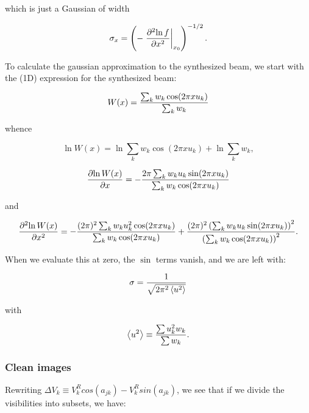 which is just a Gaussian of width

\begin{equation}
\sigma_x = \left(-\left.{\partial^2{\ln f}}\over{\partial{x^2}}\right|_{x_0}\right)^{-1/2}.
\label{eq:gapprox}
\end{equation}

To calculate the gaussian approximation to the synthesized beam, we
start with the (1D) expression for the synthesized beam:

\begin{equation}
W(x) = {{\sum_k{w_k}\cos(2\pi x u_k)}\over{\sum_k{w_k}}}
\end{equation}

whence

\begin{equation}
\ln W(x) = \ln{\sum_k{w_k}\cos(2\pi x u_k)} + \ln\sum_k{w_k},
\end{equation}

\begin{equation}
{{\partial{\ln W(x)}}\over{\partial{x}}} = -{{2\pi\sum_k{w_k u_k\sin(2\pi x u_k)}}\over{\sum_k{w_k\cos(2\pi x u_k)}}}
\end{equation}

and 

\begin{equation}
{{\partial^2{\ln W(x)}}\over{\partial{x^2}}} = -{{(2\pi)^2\sum_k{w_k u^2_k\cos(2\pi x u_k)}}\over{\sum_k{w_k\cos(2\pi x u_k)}}} + {{(2\pi)^2\left(\sum_k{w_k u_k\sin(2\pi x u_k)}\right)^2}\over{\left(\sum_k{w_k\cos(2\pi x u_k)}\right)^2}}.
\end{equation}

When we evaluate this at zero, the $\sin$ terms vanish, and we are left with:

\begin{equation}
\sigma = {1\over{\sqrt{2\pi^2\left<u^2\right>}}}
\end{equation}

with

\begin{equation}
\left<u^2\right> \equiv {{\sum{u^2_k w_k}}\over{\sum{w_k}}}.
\end{equation}

\subsubsection{Clean images}

Rewriting $\Delta V_k \equiv V^R_k cos(a_{jk}) - V^R_k sin(a_{jk})$,
we see that if we divide the visibilities into subsets, we have:

